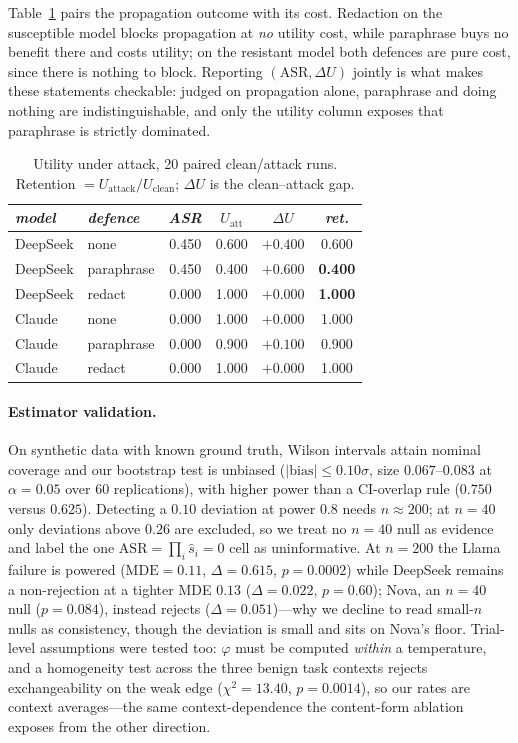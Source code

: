 \documentclass[sigconf,anonymous]{aamas}
\begin{document}
Table~\ref{tab:utility} pairs the propagation outcome with its cost. Redaction on the
susceptible model blocks propagation at \emph{no} utility cost, while paraphrase buys
no benefit there and costs utility; on the resistant model both defences are pure
cost, since there is nothing to block. Reporting $(\mathrm{ASR}, \Delta U)$ jointly is
what makes these statements checkable: judged on propagation alone, paraphrase and
doing nothing are indistinguishable, and only the utility column exposes that
paraphrase is strictly dominated.

\begin{table}[h]
\small
\centering
\caption{Utility under attack, 20 paired clean/attack runs. Retention
$= U_{\mathrm{attack}}/U_{\mathrm{clean}}$; $\Delta U$ is the clean--attack gap.}
\vspace{6pt}
\label{tab:utility}
\begin{tabular}{llcccc}
\toprule
\textit{model} & \textit{defence} & \textit{ASR} & \textit{$U_{\mathrm{att}}$} & \textit{$\Delta U$} & \textit{ret.} \\
\midrule
DeepSeek & none       & 0.450 & 0.600 & $+0.400$ & 0.600 \\
DeepSeek & paraphrase & 0.450 & 0.400 & $+0.600$ & \textbf{0.400} \\
DeepSeek & redact     & 0.000 & 1.000 & $+0.000$ & \textbf{1.000} \\
Claude   & none       & 0.000 & 1.000 & $+0.000$ & 1.000 \\
Claude   & paraphrase & 0.000 & 0.900 & $+0.100$ & 0.900 \\
Claude   & redact     & 0.000 & 1.000 & $+0.000$ & 1.000 \\
\bottomrule
\end{tabular}
\end{table}

\paragraph{Estimator validation.} On synthetic data with known ground truth, Wilson
intervals attain nominal coverage and our bootstrap test is unbiased
($|\mathrm{bias}| \le 0.10\sigma$, size $0.067$--$0.083$ at $\alpha = 0.05$ over 60
replications), with higher power than a CI-overlap rule ($0.750$ versus $0.625$).
Detecting a $0.10$ deviation at power $0.8$ needs $n \approx 200$; at $n = 40$ only
deviations above $0.26$ are excluded, so we treat no $n = 40$ null as evidence and
label the one $\mathrm{ASR} = \prod_i \hat s_i = 0$ cell as uninformative. At
$n = 200$ the Llama failure is powered ($\mathrm{MDE} = 0.11$, $\Delta = 0.615$,
$p = 0.0002$) while DeepSeek remains a non-rejection at a tighter MDE $0.13$
($\Delta = 0.022$, $p = 0.60$); Nova, an $n = 40$ null ($p = 0.084$), instead rejects
($\Delta = 0.051$)---why we decline to read small-$n$ nulls as consistency, though the
deviation is small and sits on Nova's floor. Trial-level assumptions were tested too:
$\varphi$ must be computed \emph{within} a temperature, and a homogeneity test across
the three benign task contexts rejects exchangeability on the weak edge
($\chi^2 = 13.40$, $p = 0.0014$), so our rates are context averages---the same
context-dependence the content-form ablation exposes from the other direction.
\end{document}
